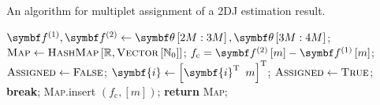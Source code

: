 \begin{algorithm}
    \caption{An algorithm for multiplet assignment of a \ac{2DJ} estimation result.}
    \label{alg:mp-assign}
    \begin{algorithmic}[1]
        \State $\bdfone, \bdftwo \gets \bth\left[2M : 3M\right], \bth\left[3M : 4M\right]$;
        \State $\textsc{Map} \gets \textsc{HashMap}\left[\mathbb{R}, \textsc{Vector}\left[\mathbb{N}_0\right]\right]$;
            \State $f_{\text{c}} = \bdftwom - \bdfonem$;
            \State $\textsc{Assigned} \gets \textsc{False}$;
                    \State $\symbf{i} \gets \left[ \symbf{i}\T \hspace{5pt} m \right]\T$;
                    \State $\textsc{Assigned} \gets \textsc{True}$;
                    \State \textbf{break};
                \EndIf
            \EndFor
                \State \textsc{Map}.insert $\left(f_{\text{c}}, \left[m\right]\right)$;
            \EndIf
        \EndFor
        \State \textbf{return} \textsc{Map};
        \EndProcedure
    \end{algorithmic}
\end{algorithm}

\clearpage
